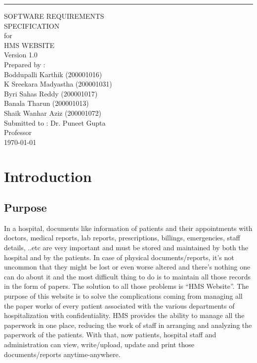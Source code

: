 \documentclass{scrreprt}
\date{}
\def\myversion{1.0 }
\begin{document}
\begin{flushright}
    \rule{16cm}{5pt}\vskip1cm
    \begin{bfseries}
        \Huge{SOFTWARE REQUIREMENTS\\ SPECIFICATION}\\
        \vspace{1cm}
        for\\
        \vspace{1cm}
        HMS WEBSITE\\
        \vspace{1cm}
        \LARGE{Version \myversion}\\
        \vspace{1cm}
        Prepared by : \\
        Boddupalli Karthik (200001016)\\
        K Sreekara Madyastha (200001031)\\
        Byri Sahas Reddy (200001017) \\
        Banala Tharun (200001013) \\
        Shaik Wanhar Aziz (200001072) \\
        \vspace{1.5cm}
        Submitted to : Dr. Puneet Gupta \\Professor\\
        \vspace{1.5cm}
        \today\\
    \end{bfseries}
\end{flushright}

\tableofcontents

\chapter{Introduction}

\section{Purpose}
In a hospital, documents like information of patients and their appointments with doctors, medical reports, lab reports, prescriptions, billings, emergencies, staff details, ..etc are very important and must be stored and maintained by both the hospital and by the patients. In case of physical documents/reports, it's not uncommon that they might be lost or even worse altered and there's nothing one can do about it and the most difficult thing to do is to maintain all those records in the form of papers. The solution to all those problems is ``HMS Website''. The purpose of this website is to solve the complications coming from managing all the paper works of every patient associated with the various departments of hospitalization with confidentiality. HMS provides the ability to manage all the paperwork in one place, reducing the work of staff in arranging and analyzing the paperwork of the patients. With that, now patients, hospital staff and administration can view, write/upload, update and print those documents/reports anytime-anywhere. 
\end{document}
